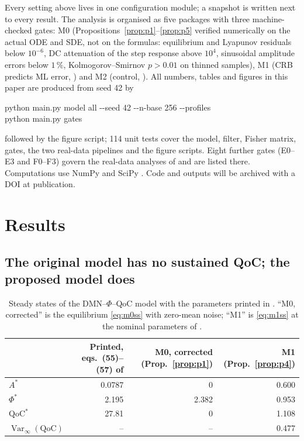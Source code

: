 \documentclass[12pt,a4paper]{article}
\theoremstyle{plain}
\theoremstyle{definition}
\theoremstyle{remark}
\newcommand{\QoC}{\mathrm{QoC}}
\newcommand{\Var}{\operatorname{Var}}
\begin{document}
Every setting above lives in one configuration module; a snapshot is written next to every result. The analysis is organised as five packages with three machine-checked gates: M0 (Propositions~\ref{prop:p1}--\ref{prop:p5} verified numerically on the actual ODE and SDE, not on the formulas: equilibrium and Lyapunov residuals below $10^{-6}$, DC attenuation of the step response above $10^{4}$, sinusoidal amplitude errors below $1\,\%$, Kolmogorov--Smirnov $p>0.01$ on thinned samples), M1 (CRB predicts ML error, ) and M2 (control, ). All numbers, tables and figures in this paper are produced from seed 42 by
\begin{center}\small\ttfamily
python main.py model all -{}-seed 42 -{}-n-base 256 -{}-profiles\\
python main.py gates
\end{center}
followed by the figure script; 114 unit tests cover the model, filter, Fisher matrix, gates, the two real-data pipelines and the figure scripts. Eight further gates (E0--E3 and F0--F3) govern the real-data analyses of  and are listed there. Computations use NumPy and SciPy \citep{Harris2020,Virtanen2020}. Code and outputs will be archived with a DOI at publication.

\section{Results}
\label{sec:results}

\subsection{The original model has no sustained QoC; the proposed model does}
\label{sec:res-m0}

\begin{table}[t]
\centering\small
\caption{Steady states of the DMN--$\Phi$--QoC model with the parameters printed in \citet{BQI}. ``M0, corrected'' is the equilibrium \eqref{eq:m0ss} with zero-mean noise; ``M1'' is \eqref{eq:m1ss} at the nominal parameters of .}
\label{tab:steady}
\begin{tabular}{lrrr}
\toprule
 & Printed, eqs.~(55)--(57) of \citep{BQI} & M0, corrected (Prop.~\ref{prop:p1}) & M1 (Prop.~\ref{prop:p4}) \\
\midrule
$A^*$            & 0.0787  & 0      & 0.600 \\
$\Phi^*$         & 2.195   & 2.382  & 0.953 \\
$\QoC^*$         & 27.81   & 0      & 1.108 \\
$\Var_\infty(\QoC)$ & --   & --     & 0.477 \\
\bottomrule
\end{tabular}
\end{table}
\end{document}
